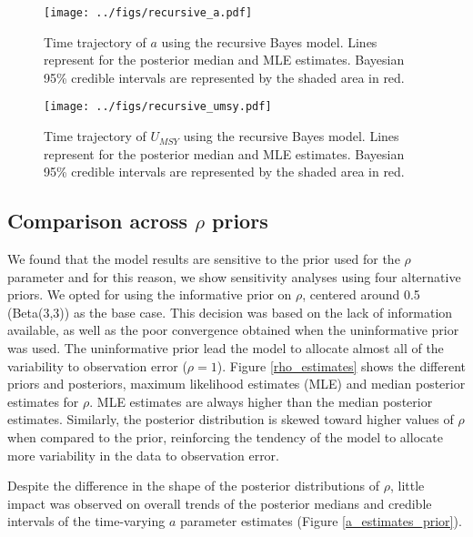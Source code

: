 \documentclass{article}
\begin{document}


\begin{figure}[htbp]
  \centering
  \texttt{[image: ../figs/recursive\_a.pdf]}
  \caption{Time trajectory of $a$ using the recursive Bayes model. Lines represent for the posterior median and MLE estimates. Bayesian 95\% credible intervals are represented by the shaded area in red. }
\label{rec_alpha}
\end{figure}


\begin{figure}[htbp]
  \centering
  \texttt{[image: ../figs/recursive\_umsy.pdf]}
  \caption{Time trajectory of $U_{MSY}$ using the recursive Bayes model. Lines represent for the posterior median and MLE estimates. Bayesian 95\% credible intervals are represented by the shaded area in red.}
\label{rec_umsy}
\end{figure}



\subsection{Comparison across $\rho$ priors}

We found that the model results are sensitive to the prior used for the $\rho$ parameter and for this reason, we show sensitivity analyses using four alternative priors.  We opted for using the informative prior on $\rho$, centered around 0.5 (Beta(3,3)) as the base case. This decision was based on the lack of information available, as well as the poor convergence obtained when the uninformative prior was used. The uninformative prior lead the model to allocate almost all of the variability to observation error ($\rho = 1$). Figure \ref{rho_estimates} shows the different priors and posteriors, maximum likelihood estimates (MLE) and median posterior estimates for $\rho$. MLE estimates are always higher than the median posterior estimates. Similarly, the posterior distribution is skewed toward higher values of $\rho$ when compared to the prior, reinforcing the tendency of the model to allocate more variability in the data to observation error.

Despite the difference in the shape of the posterior distributions of $\rho$, little impact was observed on overall trends of the posterior medians and credible intervals of the time-varying $a$ parameter estimates (Figure \ref{a_estimates_prior}). 
\end{document}
